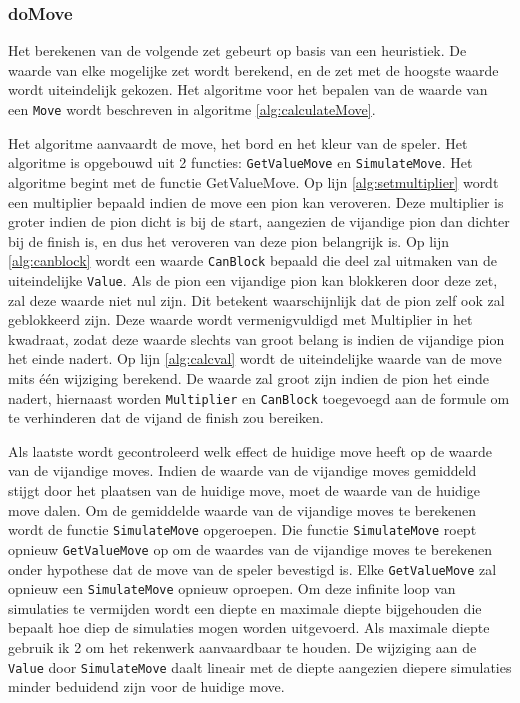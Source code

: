 \documentclass{article}
\begin{document}
\subsubsection{doMove}
Het berekenen van de volgende zet gebeurt op basis van een heuristiek. De waarde van elke mogelijke zet wordt berekend, en de zet met de hoogste waarde wordt uiteindelijk gekozen. 
Het algoritme voor het bepalen van de waarde van een \texttt{Move} wordt beschreven in algoritme \ref{alg:calculateMove}. 

Het algoritme aanvaardt de move, het bord en het kleur van de speler.
Het algoritme is opgebouwd uit 2 functies: \texttt{GetValueMove} en \texttt{SimulateMove}. Het algoritme begint met de functie GetValueMove. Op lijn \ref{alg:setmultiplier} wordt een multiplier bepaald indien de move een pion kan veroveren. Deze multiplier is groter indien de pion dicht is bij de start, aangezien de vijandige pion dan dichter bij de finish is, en dus het veroveren van deze pion belangrijk is. Op lijn \ref{alg:canblock} wordt een waarde \texttt{CanBlock} bepaald die deel zal uitmaken van de uiteindelijke \texttt{Value}. Als de pion een vijandige pion kan blokkeren door deze zet, zal deze waarde niet nul zijn. Dit betekent waarschijnlijk dat de pion zelf ook zal geblokkeerd zijn. Deze waarde wordt vermenigvuldigd met Multiplier in het kwadraat, zodat deze waarde slechts van groot belang is indien de vijandige pion het einde nadert. Op lijn \ref{alg:calcval} wordt de uiteindelijke waarde van de move mits één wijziging berekend. De waarde zal groot zijn indien de pion het einde nadert, hiernaast worden \texttt{Multiplier} en \texttt{CanBlock} toegevoegd aan de formule om te verhinderen dat de vijand de finish zou bereiken. 

Als laatste wordt gecontroleerd welk effect de huidige move heeft op de waarde van de vijandige moves. Indien de waarde van de vijandige moves gemiddeld stijgt door het plaatsen van de huidige move, moet de waarde van de huidige move dalen. Om de gemiddelde waarde van de vijandige moves te berekenen wordt de functie \texttt{SimulateMove} opgeroepen. Die functie \texttt{SimulateMove} roept opnieuw \texttt{GetValueMove} op om de waardes van de vijandige moves te berekenen onder hypothese dat de move van de speler bevestigd is. Elke \texttt{GetValueMove} zal opnieuw een \texttt{SimulateMove} opnieuw oproepen. Om deze infinite loop van simulaties te vermijden wordt een diepte en maximale diepte bijgehouden die bepaalt hoe diep de simulaties mogen worden uitgevoerd. Als maximale diepte gebruik ik 2 om het rekenwerk aanvaardbaar te houden. 
De wijziging aan de \texttt{Value} door \texttt{SimulateMove} daalt lineair met de diepte aangezien diepere simulaties minder beduidend zijn voor de huidige move. 
\end{document}
